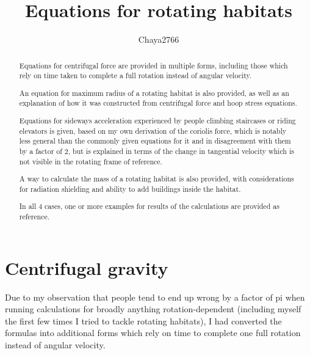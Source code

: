 \documentclass[a4paper]{article}
\title{Equations for rotating habitats}
\author{Chaya2766}
\begin{document}
	\sffamily
	\sloppy
	
	\maketitle
	
	\vfill
	
	\begin{abstract}
		Equations for centrifugal force are provided in multiple forms, including those which rely on time taken to complete a full rotation instead of angular velocity.
		
		\medskip
		
		An equation for maximum radius of a rotating habitat is also provided, as well as an explanation of how it was constructed from centrifugal force and hoop stress equations.
		
		\medskip
		
		Equations for sideways acceleration experienced by people climbing staircases or riding elevators is given, based on my own derivation of the coriolis force, which is notably less general than the commonly given equations for it and in disagreement with them by a factor of 2, but is explained in terms of the change in tangential velocity which is not visible in the rotating frame of reference.
		
		\medskip
		
		A way to calculate the mass of a rotating habitat is also provided, with considerations for radiation shielding and ability to add buildings inside the habitat.
		
		\medskip
		
		In all 4 cases, one or more examples for results of the calculations are provided as reference.
	\end{abstract}
	
	\vfill
	
	\tableofcontents
	
	\pagebreak
	
	\section{Centrifugal gravity}
	
	Due to my observation that people tend to end up wrong by a factor of pi when running calculations for broadly anything rotation-dependent (including myself the first few times I tried to tackle rotating habitats), I had converted the formulas into additional forms which rely on time to complete one full rotation instead of angular velocity.
	
\end{document}
